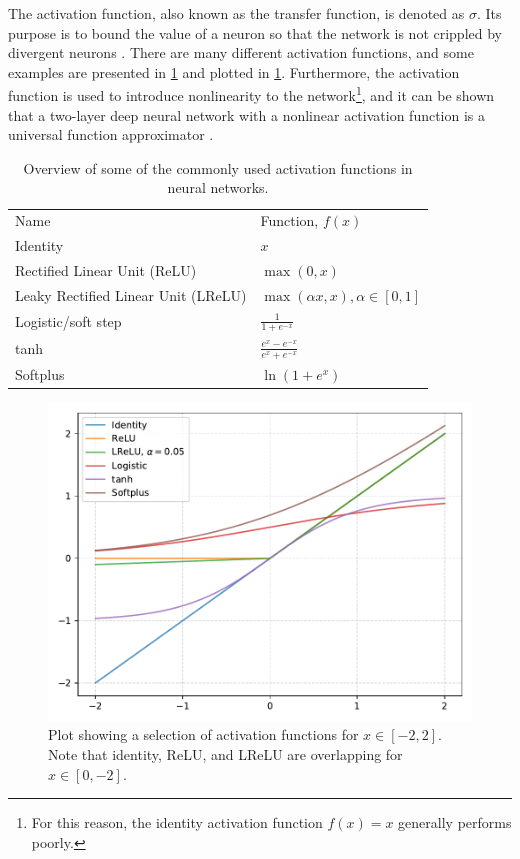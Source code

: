 The activation function, also known as the transfer function, is denoted as $\sigma$. Its purpose is to bound the value of a neuron so that the network is not crippled by divergent neurons \cite[81]{Wang2003}. There are many different activation functions, and some examples are presented in \cref{tab:activationfunctions} and plotted in \cref{fig:activationfunctions}. Furthermore, the activation function is used to introduce nonlinearity to the network\footnote{For this reason, the identity activation function $f(x)=x$ generally performs poorly.}, and it can be shown that a two-layer deep neural network with a nonlinear activation function is a universal function approximator \cite{Cybenko1989}. 

\begin{table}[htbp]
    \centering
    \caption[Activation functions]{Overview of some of the commonly used activation functions in neural networks. }
    \label{tab:activationfunctions}
    \begin{tabular}{ll}
    \hline
    Name & Function, $f(x)$ \\
    \hhline{==}
    Identity & $x$ \\
    Rectified Linear Unit (ReLU) & $\max\left(0, x\right)$ \\
    Leaky Rectified Linear Unit (LReLU) & $\max\left(\alpha x, x\right), \alpha\in[0,1]$ \\
    Logistic/soft step & $\frac{1}{1+e^{-x}}$  \\
    tanh & $\frac{e^x - e^{-x}}{e^x + e^{-x}}$ \\
    Softplus & $\ln\left(1+e^x\right)$ \\
    \hline
    \end{tabular}
\end{table}

\begin{figure}[htbp]  
    \centering
    \includegraphics[width=.8\textwidth]{figures/activationfunctions.pdf}
    \caption[Activation functions]{Plot showing a selection of activation functions for $x\in[-2,2]$. Note that identity, ReLU, and LReLU are overlapping for $x\in[0,-2]$. }
    \label{fig:activationfunctions}
\end{figure}

